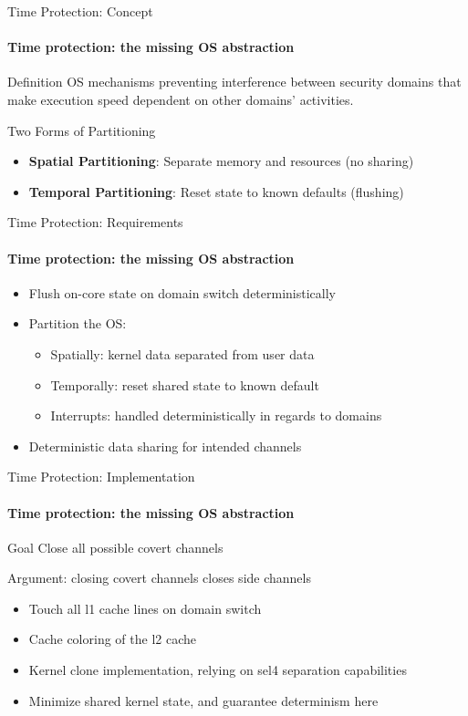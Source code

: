 \begin{frame}{Time Protection: Concept}
  \framesubtitle{Time protection: the missing OS abstraction}
	\begin{block}{Definition}
    OS mechanisms preventing interference between security domains that make
    execution speed dependent on other domains' activities.
	\end{block}

	\vspace{0.5cm}

  \pause
	\begin{block}{Two Forms of Partitioning}
		\begin{itemize}
			\item \textbf{Spatial Partitioning}: Separate memory and resources (no sharing)
			\item \textbf{Temporal Partitioning}: Reset state to known defaults (flushing)
		\end{itemize}
	\end{block}
\end{frame}

\begin{frame}{Time Protection: Requirements}
  \framesubtitle{Time protection: the missing OS abstraction}
  \begin{itemize}[<+->]
		\item Flush on-core state on domain switch deterministically
		\item Partition the OS:
		      \begin{itemize}
			      \item Spatially: kernel data separated from user data
			      \item Temporally: reset shared state to known default
			      \item Interrupts: handled deterministically in regards to domains
		      \end{itemize}
		\item Deterministic data sharing for intended channels
	\end{itemize}
\end{frame}

\begin{frame}{Time Protection: Implementation}
  \framesubtitle{Time protection: the missing OS abstraction}
	\begin{block}{Goal}
		Close all possible covert channels

		Argument: closing covert channels closes side channels
	\end{block}
	\begin{itemize}
		\item Touch all l1 cache lines on domain switch
    \item Cache coloring of the l2 cache
    \item Kernel clone implementation, relying on sel4 separation capabilities
    \item Minimize shared kernel state, and guarantee determinism here
	\end{itemize}
\end{frame}
